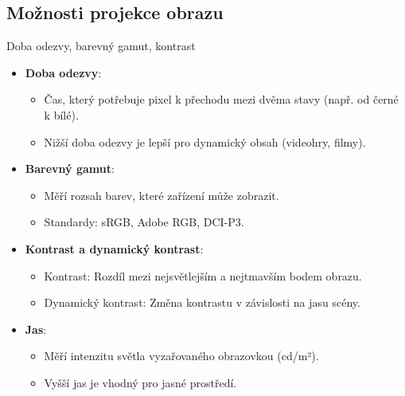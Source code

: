 \documentclass[aspectratio=43]{beamer}
\begin{document}
\subsection{Možnosti projekce obrazu}
\begin{frame}{Doba odezvy, barevný gamut, kontrast}
    \begin{itemize}
        \item \textbf{Doba odezvy}: 
        \begin{itemize}
            \item Čas, který potřebuje pixel k přechodu mezi dvěma stavy (např. od černé k bílé).
            \item Nižší doba odezvy je lepší pro dynamický obsah (videohry, filmy).
        \end{itemize}
        \item \textbf{Barevný gamut}: 
        \begin{itemize}
            \item Měří rozsah barev, které zařízení může zobrazit.
            \item Standardy: sRGB, Adobe RGB, DCI-P3.
        \end{itemize}
        \item \textbf{Kontrast a dynamický kontrast}:
        \begin{itemize}
            \item Kontrast: Rozdíl mezi nejsvětlejším a nejtmavším bodem obrazu.
            \item Dynamický kontrast: Změna kontrastu v závislosti na jasu scény.
        \end{itemize}
        \item \textbf{Jas}: 
        \begin{itemize}
            \item Měří intenzitu světla vyzařovaného obrazovkou (cd/m²).
            \item Vyšší jas je vhodný pro jasné prostředí.
        \end{itemize}
    \end{itemize}
\end{frame}
\end{document}
